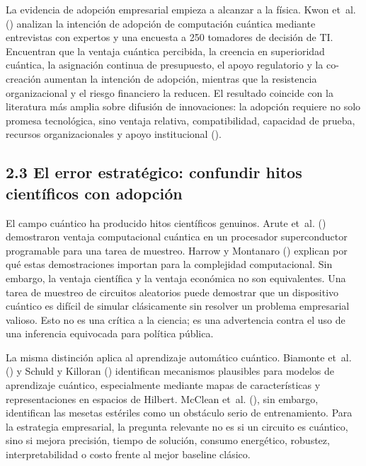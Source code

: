 \documentclass[
  11pt,
  letterpaper,
]{article}
\begin{document}
La evidencia de adopción empresarial empieza a alcanzar a la física.
Kwon et~al. () analizan la intención de
adopción de computación cuántica mediante entrevistas con expertos y una
encuesta a 250 tomadores de decisión de TI. Encuentran que la ventaja
cuántica percibida, la creencia en superioridad cuántica, la asignación
continua de presupuesto, el apoyo regulatorio y la co-creación aumentan
la intención de adopción, mientras que la resistencia organizacional y
el riesgo financiero la reducen. El resultado coincide con la literatura
más amplia sobre difusión de innovaciones: la adopción requiere no solo
promesa tecnológica, sino ventaja relativa, compatibilidad, capacidad de
prueba, recursos organizacionales y apoyo institucional
().

\subsection{2.3 El error estratégico: confundir hitos científicos con
adopción}\label{el-error-estratuxe9gico-confundir-hitos-cientuxedficos-con-adopciuxf3n}

El campo cuántico ha producido hitos científicos genuinos. Arute et~al.
() demostraron ventaja computacional
cuántica en un procesador superconductor programable para una tarea de
muestreo. Harrow y Montanaro () explican
por qué estas demostraciones importan para la complejidad computacional.
Sin embargo, la ventaja científica y la ventaja económica no son
equivalentes. Una tarea de muestreo de circuitos aleatorios puede
demostrar que un dispositivo cuántico es difícil de simular clásicamente
sin resolver un problema empresarial valioso. Esto no es una crítica a
la ciencia; es una advertencia contra el uso de una inferencia
equivocada para política pública.

La misma distinción aplica al aprendizaje automático cuántico. Biamonte
et~al. () y Schuld y Killoran
() identifican mecanismos plausibles para
modelos de aprendizaje cuántico, especialmente mediante mapas de
características y representaciones en espacios de Hilbert. McClean
et~al. (), sin embargo, identifican las
mesetas estériles como un obstáculo serio de entrenamiento. Para la
estrategia empresarial, la pregunta relevante no es si un circuito es
cuántico, sino si mejora precisión, tiempo de solución, consumo
energético, robustez, interpretabilidad o costo frente al mejor baseline
clásico.
\end{document}
